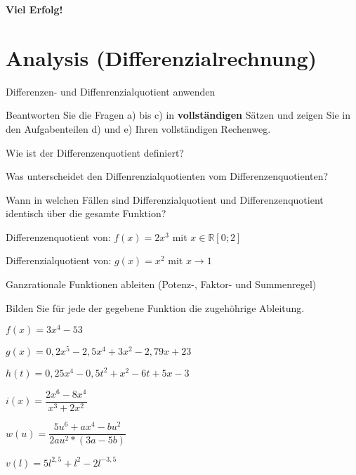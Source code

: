\documentclass[
    ngerman,
    color=1b,
    load_common,
    leqno,
    boxarc,
    solution=true,
]{rubos-tuda-template}
\begin{document}
{\large \textbf{Viel Erfolg!}}
\clearpage



\section*{Analysis (Differenzialrechnung)}
\begin{task}[points=1]{Differenzen- und Diffenrenzialquotient anwenden}
    \begin{grayInfoBox}
        Beantworten Sie die Fragen a) bis c) in \textbf{vollständigen} Sätzen und zeigen Sie in den Aufgabenteilen d) und e) Ihren vollständigen Rechenweg.
    \end{grayInfoBox}
    \begin{cpenumerate}[label=\alph*), itemsep=1em]
        \item Wie ist der Differenzenquotient definiert?
        \item Was unterscheidet den Diffenrenzialquotienten vom Differenzenquotienten?
        \item Wann in welchen Fällen sind Differenzialquotient und Differenzenquotient identisch über die gesamte Funktion?
        \item Differenzenquotient von: $f(x)=2x^3$ mit $x\in\mathbb{R} [0;2]$
        \item Differenzialquotient von: $g(x)=x^2$ mit $x\to1$
    \end{cpenumerate}
\end{task}
\begin{task}[points=9]{Ganzrationale Funktionen ableiten (Potenz-, Faktor- und Summenregel)}
    \begin{grayInfoBox}
        Bilden Sie für jede der gegebene Funktion die zugehöhrige Ableitung.
    \end{grayInfoBox}
    \begin{cpenumerate}[label=\alph*), itemsep=1em]
        \item $f(x)=3x^4-53$
        \item $g(x)=0,2x^5-2,5x^4+3x^2-2,79x+23$
        \item $h(t)=0,25x^4-0,5t^2+x^2-6t+5x-3$
        \item $i(x)=\dfrac{2x^6-8x^4}{x^3+2x^2}$
        \item $w(u)=\dfrac{5u^6+ax^4-bu^2}{2au^2*(3a-5b)}$
        \item $v(l)=5l^{2,5}+l^2-2l^{-3,5}$
    \end{cpenumerate}
\end{task}
\end{document}
